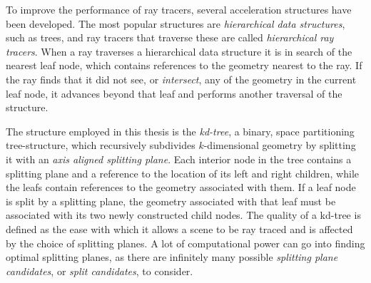 

To improve the performance of ray tracers, several acceleration structures have
been developed. The most popular structures are \textit{hierarchical data
  structures}, such as trees, and ray tracers that traverse these are called
\textit{hierarchical ray tracers}. When a ray traverses a hierarchical data
structure it is in search of the nearest leaf node, which contains references to
the geometry nearest to the ray. If the ray finds that it did not see, or
\textit{intersect}, any of the geometry in the current leaf node, it advances
beyond that leaf and performs another traversal of the structure.

The structure employed in this thesis is the \textit{kd-tree}, a binary, space
partitioning tree-structure, which recursively subdivides $k$-dimensional
geometry by splitting it with an \textit{axis aligned splitting plane}. Each
interior node in the tree contains a splitting plane and a reference to the
location of its left and right children, while the leafs contain references to
the geometry associated with them.
If a leaf node is split by a splitting plane, the geometry associated with that
leaf must be associated with its two newly constructed child nodes. The quality
of a kd-tree is defined as the ease with which it allows a scene to be ray
traced and is affected by the choice of splitting planes. A lot of computational
power can go into finding optimal splitting planes, as there are infinitely many
possible \textit{splitting plane candidates}, or \textit{split candidates}, to
consider.


